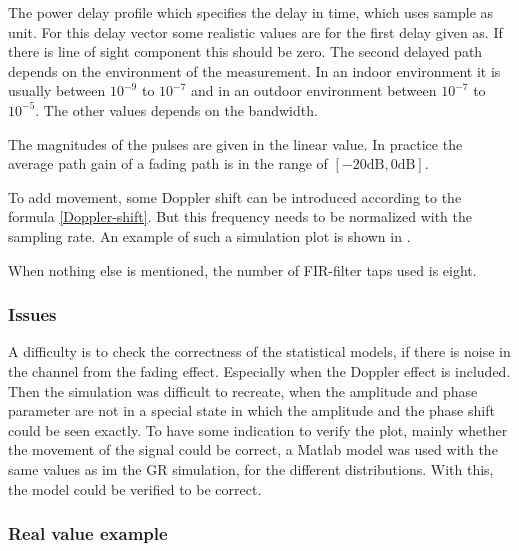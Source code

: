 
The power delay profile which specifies the delay in time, which uses sample as unit. For this delay vector some realistic values are for the first delay \cite{Mathworks} given as. If there is  line of sight component this should be zero. The second delayed path depends on the environment of the measurement. In an indoor environment it is usually between \(10^{-9}\) to \(10^{-7}\) and in an outdoor environment between \(10^{-7}\) to \(10^{-5}\). The other values depends on the bandwidth. 

The magnitudes of the pulses are given in the linear value. In practice the average path gain of a fading path is in the range of \([ -20 \text{dB} , 0\text{dB}]\).

To add movement, some Doppler shift can be introduced according to the formula \eqref{Doppler-shift}. But this frequency needs to be normalized with the sampling rate. 
An example of such a simulation plot is shown in .

When nothing else is mentioned, the number of FIR-filter taps used is eight.


\subsubsection{Issues}

A difficulty is to check the correctness of the statistical models, if there is noise in the channel from the fading effect. Especially when the Doppler effect is included. Then the simulation was difficult to recreate, when the amplitude and phase parameter are not in a special state in which the amplitude and the phase shift could be seen exactly. 
To have some indication to verify the plot, mainly whether the movement of the signal could be correct, a Matlab model was used with the same values as im the GR simulation, for the different distributions. With this, the model could be verified to be correct.

\subsubsection{Real value example}

